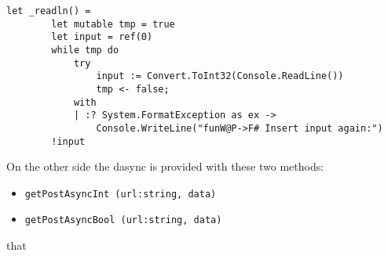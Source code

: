 \begin{lstlisting}[caption=All \fwap \texttt{readln()}'s are compiled into \fsharps \texttt{\_readln()}'s.]
let _readln() =
        let mutable tmp = true
        let input = ref(0)
        while tmp do
            try
                input := Convert.ToInt32(Console.ReadLine())
                tmp <- false;
            with
            | :? System.FormatException as ex ->
                Console.WriteLine("funW@P->F# Insert input again:")
        !input
\end{lstlisting}

On the other side the dasync is provided with these two methods:
\begin{itemize}
	\item \texttt{getPostAsyncInt (url:string, data)}
	\item \texttt{getPostAsyncBool (url:string, data)}
\end{itemize}
that %
 


